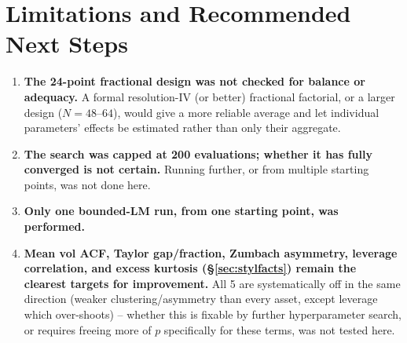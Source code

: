 \documentclass[11pt]{article}
\begin{document}
\section{Limitations and Recommended Next Steps}
\begin{enumerate}
\item \textbf{The 24-point fractional design was not checked for balance or
adequacy.} A formal resolution-IV (or better) fractional factorial, or a larger design
($N=48$--$64$), would give a more reliable average and let individual parameters'
effects be estimated rather than only their aggregate.
\item \textbf{The search was capped at 200 evaluations; whether it has fully
converged is not certain.} Running further, or from multiple starting points, was not
done here.
\item \textbf{Only one bounded-LM run, from one starting point, was performed.}
\item \textbf{Mean vol ACF, Taylor gap/fraction, Zumbach asymmetry, leverage
correlation, and excess kurtosis (\S\ref{sec:stylfacts}) remain the clearest targets
for improvement.} All 5 are systematically off in the same direction (weaker
clustering/asymmetry than every asset, except leverage which over-shoots) -- whether
this is fixable by further hyperparameter search, or requires freeing more of $p$
specifically for these terms, was not tested here.
\end{enumerate}
\end{document}
